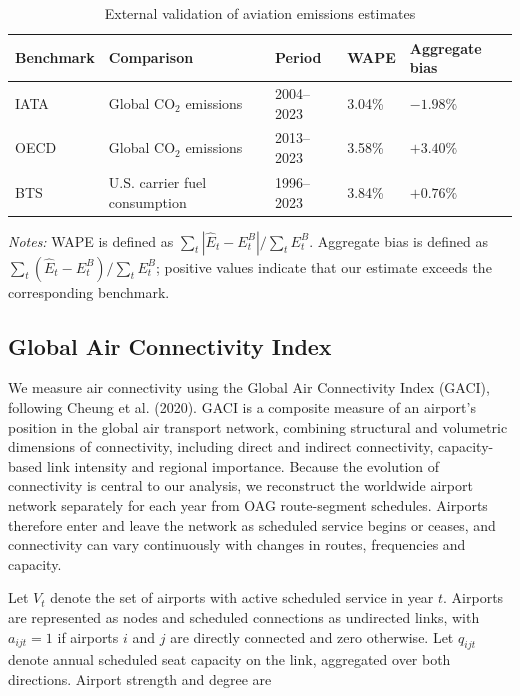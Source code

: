 \documentclass[12pt]{article}
\begin{document}
\begin{table}[htbp]
\centering
\caption{External validation of aviation emissions estimates}
\label{tab:validation_benchmarks}
\small
\begin{tabular}{lllll}
\hline
Benchmark & Comparison & Period & WAPE & Aggregate bias \\
\hline
IATA & Global CO$_2$ emissions & 2004--2023 & 3.04\% & $-1.98\%$ \\
OECD & Global CO$_2$ emissions & 2013--2023 & 3.58\% & $+3.40\%$ \\
BTS & U.S. carrier fuel consumption & 1996--2023 & 3.84\% & $+0.76\%$ \\
\hline
\end{tabular}

\vspace{0.4em}
\begin{minipage}{0.96\linewidth}
\footnotesize\textit{Notes:} WAPE is defined as $\sum_t |\widehat{E}_t-E_t^B|/\sum_t E_t^B$. Aggregate bias is defined as $\sum_t(\widehat{E}_t-E_t^B)/\sum_t E_t^B$; positive values indicate that our estimate exceeds the corresponding benchmark.
\end{minipage}
\end{table}

\subsection*{Global Air Connectivity Index}

We measure air connectivity using the Global Air Connectivity Index (GACI), following Cheung et al. (2020). GACI is a composite measure of an airport's position in the global air transport network, combining structural and volumetric dimensions of connectivity, including direct and indirect connectivity, capacity-based link intensity and regional importance. Because the evolution of connectivity is central to our analysis, we reconstruct the worldwide airport network separately for each year from OAG route-segment schedules. Airports therefore enter and leave the network as scheduled service begins or ceases, and connectivity can vary continuously with changes in routes, frequencies and capacity.

Let $V_t$ denote the set of airports with active scheduled service in year $t$. Airports are represented as nodes and scheduled connections as undirected links, with $a_{ijt}=1$ if airports $i$ and $j$ are directly connected and zero otherwise. Let $q_{ijt}$ denote annual scheduled seat capacity on the link, aggregated over both directions. Airport strength and degree are
\end{document}
